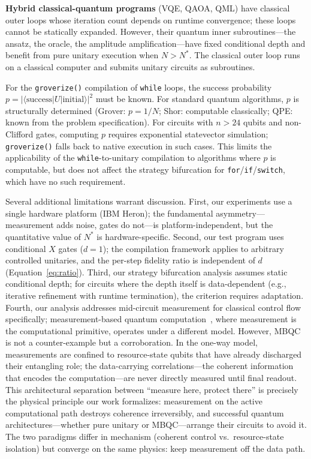 \documentclass[11pt]{article}
\begin{document}
\textbf{Hybrid classical-quantum programs} (VQE, QAOA, QML) have classical outer loops whose iteration count depends on runtime convergence; these loops cannot be statically expanded.
However, their quantum inner subroutines---the ansatz, the oracle, the amplitude amplification---have fixed conditional depth and benefit from pure unitary execution when $N > N^*$.
The classical outer loop runs on a classical computer and submits unitary circuits as subroutines.

For the \texttt{groverize()} compilation of \texttt{while} loops, the success probability $p = |\langle \text{success} | U | \text{initial} \rangle|^2$ must be known.
For standard quantum algorithms, $p$ is structurally determined (Grover: $p = 1/N$; Shor: computable classically; QPE: known from the problem specification).
For circuits with $n > 24$ qubits and non-Clifford gates, computing $p$ requires exponential statevector simulation; \texttt{groverize()} falls back to native execution in such cases.
This limits the applicability of the \texttt{while}-to-unitary compilation to algorithms where $p$ is computable, but does not affect the strategy bifurcation for \texttt{for}/\texttt{if}/\texttt{switch}, which have no such requirement.

Several additional limitations warrant discussion.
First, our experiments use a single hardware platform (IBM Heron); the fundamental asymmetry---measurement adds noise, gates do not---is platform-independent, but the quantitative value of $N^*$ is hardware-specific.
Second, our test program uses conditional $X$ gates ($d = 1$); the compilation framework applies to arbitrary controlled unitaries, and the per-step fidelity ratio is independent of $d$ (Equation~\ref{eq:ratio}).
Third, our strategy bifurcation analysis assumes static conditional depth; for circuits where the depth itself is data-dependent (e.g., iterative refinement with runtime termination), the criterion requires adaptation.
Fourth, our analysis addresses mid-circuit measurement for classical control flow specifically; measurement-based quantum computation~\cite{raussendorf2001}, where measurement is the computational primitive, operates under a different model.
However, MBQC is not a counter-example but a corroboration.
In the one-way model, measurements are confined to resource-state qubits that have already discharged their entangling role; the data-carrying correlations---the coherent information that encodes the computation---are never directly measured until final readout.
This architectural separation between ``measure here, protect there'' is precisely the physical principle our work formalizes: measurement on the active computational path destroys coherence irreversibly, and successful quantum architectures---whether pure unitary or MBQC---arrange their circuits to avoid it.
The two paradigms differ in mechanism (coherent control vs.\ resource-state isolation) but converge on the same physics: keep measurement off the data path.
\end{document}
